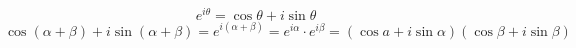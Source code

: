 \begin{equation}
{e^{i\theta }} = \cos \theta  + i\sin \theta 
\end{equation}
$
\cos \left( {\alpha  + \beta } \right) + i\sin \left( {\alpha  + \beta } \right) = {e^{i\left( {\alpha  + \beta } \right)}} = {e^{i\alpha }} \cdot {e^{i\beta }} = \left( {\cos a + i\sin \alpha } \right)\left( {\cos \beta  + i\sin \beta } \right)
$
